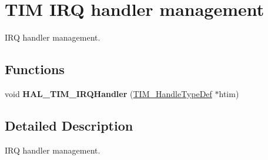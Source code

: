\hypertarget{group___t_i_m___exported___functions___group7}{}\section{T\+IM I\+RQ handler management}
\label{group___t_i_m___exported___functions___group7}


I\+RQ handler management.  


\subsection*{Functions}
\begin{DoxyCompactItemize}
\item 
\mbox{\label{group___t_i_m___exported___functions___group7_ga2dc3ef34340412aa8a01d734d2ff8f88}} 
void {\bfseries H\+A\+L\+\_\+\+T\+I\+M\+\_\+\+I\+R\+Q\+Handler} (\hyperlink{struct_t_i_m___handle_type_def}{T\+I\+M\+\_\+\+Handle\+Type\+Def} $\ast$htim)
\end{DoxyCompactItemize}


\subsection{Detailed Description}
I\+RQ handler management. 

